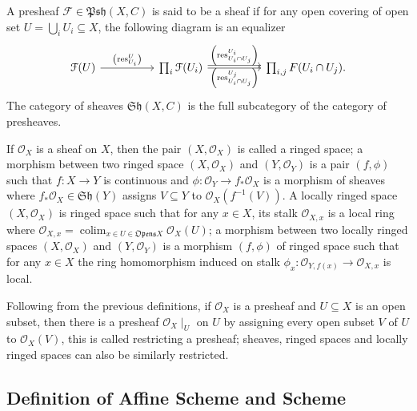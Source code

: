 \documentclass[a4paper,UKenglish,cleveref, autoref, thm-restate]{lipics-v2021}
\begin{document}
\begin{definition}
    A presheaf $\mathcal{F}\in\mathfrak{Psh}(X, C)$ is said to be a sheaf if for any open covering of open set $U=\bigcup_i U_i \subseteq X$, the following diagram is an equalizer
    \[
        \begin{tikzcd}[sep=huge]
        \mathcal{F}(U) \arrow[r, "\left(\mathrm{res}^U_{U_i}\right)"] & \prod_i \mathcal{F}(U_i) \arrow[r, "\left(\mathrm{res}^{U_i}_{U_i\cap U_j}\right)"] \arrow[r, shift left, "\left(\mathrm{res}^{U_j}_{U_i\cap U_j}\right)"'] & \prod_{i, j} F(U_i \cap U_j).
        \end{tikzcd}
    \]
    The category of sheaves $\mathfrak{Sh}(X,C)$ is the full subcategory of the category of presheaves.
\end{definition}

\begin{definition} 
    If $\mathcal{O}_X$ is a sheaf on $X$, then the pair $(X, \mathcal{O}_X)$ is called a ringed space; a morphism between two ringed space $(X, \mathcal{O}_X)$ and $(Y, \mathcal{O}_Y)$ is a pair $(f, \phi)$ such that $f: X \to Y$ is continuous and $\phi : \mathcal{O}_Y\to f_*\mathcal{O}_X$ is a morphism of sheaves where $f_*\mathcal{O}_X \in\mathfrak{Sh}(Y)$ assigns $V \subseteq Y$ to $\mathcal{O}_X(f^{-1}(V))$. A locally ringed space $(X, \mathcal{O}_X)$ is ringed space such that for any $x \in X$, its stalk $\mathcal{O}_{X, x}$ is a local ring where $\mathcal{O}_{X, x}=\operatorname{colim}_{x \in U \in \mathfrak{Opens} X} \mathcal{O}_X(U)$; a morphism between two locally ringed spaces $(X, \mathcal{O}_X)$ and $(Y, \mathcal{O}_Y)$ is a morphism $(f, \phi)$ of ringed space such that for any $x\in X$ the ring homomorphism induced on stalk $\phi_x : \mathcal{O}_{Y, f(x)}\to \mathcal{O}_{X, x}$ is local.
\end{definition}

Following from the previous definitions, if $\mathcal{O}_X$ is a presheaf and $U\subseteq X$ is an open subset, then there is a presheaf $\mathcal{O}_X\!\mid_U$ on $U$ by assigning every open subset $V$ of $U$ to $\mathcal{O}_X(V)$, this is called restricting a presheaf; sheaves, ringed spaces and locally ringed spaces can also be similarly restricted.

\subsection{Definition of Affine Scheme and Scheme}\label{sec:def_scheme}
\end{document}
